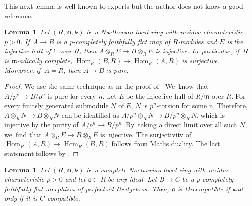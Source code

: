 \documentclass[11pt]{article}
\theoremstyle{plain}
\newtheorem{lemma}[theorem]{Lemma}
\theoremstyle{definition}
\numberwithin{equation}{theorem}
\let\tensor\otimes
\newcommand{\fra}{\mathfrak{a}}
\newcommand{\fram}{\mathfrak{m}}
\DeclareMathOperator{\Hom}{Hom}
\begin{document}
\noindent This next lemma is well-known to experts but the author does not know a good reference.

\begin{lemma}\label{pcomp fflat implies pure}
Let $(R,\fram,k)$ be a Noetherian local ring with residue characteristic $p>0$. If~$A\to B$ is a $p$-completely faithfully flat map of $R$\nobreakdash-modules and $E$ is the injective hull of $k$ over $R$, then $A\tensor_R E\to B\tensor_R E$ is injective. In~particular, if~$R$ is $\fram$-adically complete, $\Hom_R(B,R)\to \Hom_R(A,R)$ is surjective. Moreover, if~$A=R$, then $A\to B$ is pure.
\end{lemma}

\begin{proof}
We use the same technique as in the proof of \cite[Lem.\,4.5]{BMPSTWWPerfectoidPure}. We~know that $A/p^n\to B/p^n$ is pure for every $n$. Let $E$ be the injective hull of $R/\fram$ over $R$. For every finitely generated submodule $N$ of $E$, $N$ is $p^n$-torsion for some n. Therefore, $A\tensor_R N \to B\tensor_R N$ can be identified as $A/p^n\tensor_R N \to B/p^n \tensor_R N$, which is injective by the purity of $A/p^n\to B/p^n$. By~taking a direct limit over all such $N$, we~find that $A\tensor_R E \to B\tensor_R E$ is injective. The surjectivity of $\Hom_R(A,R)\to \Hom_R(B,R)$ follows from Matlis duality.
The last statement follows by \cite[Prop.\,6.11]{HochsterRobertsRingsOfInvariants}.
\end{proof}

\begin{lemma}\label{compatible iff pcomp fflat comp}
Let $(R,\fram,k)$ be a complete Noetherian local ring with residue characteristic $p>0$ and let $\fra\subset R$ be any ideal.
Let $B\to C$ be a $p$-completely faithfully flat morphism of perfectoid $R$\nobreakdash-algebras. Then, $\fra$ is $B$-compatible if and only if it is $C$-compatible.
\end{lemma}
\end{document}
